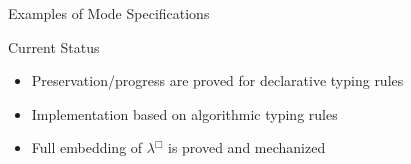 \documentclass[letterpaper,12pt,aspectratio=169,show notes,dvipsnames]{beamer}
\begin{document}
\begin{frame}[fragile]{Examples of Mode Specifications}
\end{frame}

\begin{frame}{Current Status}
  \begin{itemize}
  \item Preservation/progress are proved for declarative typing rules
  \item Implementation based on algorithmic typing rules
  \item Full embedding of \(\lambda^{\Box}\) is proved and mechanized
  \end{itemize}
\end{frame}
\end{document}
